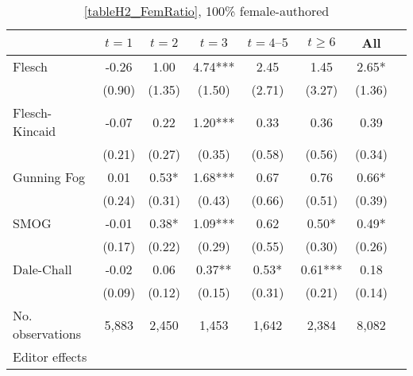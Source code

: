 \begin{table}
    \footnotesize
    \centering
    \begin{threeparttable}
        \caption{\autoref{tableH2_FemRatio}, 100\% female-authored}
        \label{tableH2_Fem100}
        \begin{tabular}{p{3cm}S@{}S@{}S@{}S@{}S@{}S@{}S@{}}
            \toprule
            &{\(t=1\)}&{\(t=2\)}&{\(t=3\)}&{\(t=4\text{--}5\)}&{\(t\ge6\)}&{All}\\
            \midrule
            Flesch                        &       -0.26   &        1.00   &        4.74***&        2.45   &        1.45   &        2.65*  \\
                                          &      (0.90)   &      (1.35)   &      (1.50)   &      (2.71)   &      (3.27)   &      (1.36)   \\
            Flesch-Kincaid                &       -0.07   &        0.22   &        1.20***&        0.33   &        0.36   &        0.39   \\
                                          &      (0.21)   &      (0.27)   &      (0.35)   &      (0.58)   &      (0.56)   &      (0.34)   \\
            Gunning Fog                   &        0.01   &        0.53*  &        1.68***&        0.67   &        0.76   &        0.66*  \\
                                          &      (0.24)   &      (0.31)   &      (0.43)   &      (0.66)   &      (0.51)   &      (0.39)   \\
            SMOG                          &       -0.01   &        0.38*  &        1.09***&        0.62   &        0.50*  &        0.49*  \\
                                          &      (0.17)   &      (0.22)   &      (0.29)   &      (0.55)   &      (0.30)   &      (0.26)   \\
            Dale-Chall                    &       -0.02   &        0.06   &        0.37** &        0.53*  &        0.61***&        0.18   \\
                                          &      (0.09)   &      (0.12)   &      (0.15)   &      (0.31)   &      (0.21)   &      (0.14)   \\
            \midrule
            No. observations              &       5,883   &       2,450   &       1,453   &       1,642   &       2,384   &       8,082   \\
            \midrule
            Editor effects       &           {}   &           {}   &           {}   &           {}   &           {}   &           {}   \\

\end{tabular}
\end{threeparttable}
\end{table}
